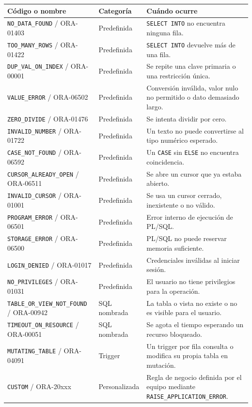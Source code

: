 \documentclass[10pt,letterpaper]{article}
\begin{document}
\begin{longtable}{p{} p{} p{}}
\toprule \textbf{Código o nombre} & \textbf{Categoría} & \textbf{Cuándo ocurre}\\
\midrule
\texttt{NO\_DATA\_FOUND} / ORA-01403 & Predefinida & \texttt{SELECT INTO} no encuentra ninguna fila.\\
\texttt{TOO\_MANY\_ROWS} / ORA-01422 & Predefinida & \texttt{SELECT INTO} devuelve más de una fila.\\
\texttt{DUP\_VAL\_ON\_INDEX} / ORA-00001 & Predefinida & Se repite una clave primaria o una restricción única.\\
\texttt{VALUE\_ERROR} / ORA-06502 & Predefinida & Conversión inválida, valor nulo no permitido o dato demasiado largo.\\
\texttt{ZERO\_DIVIDE} / ORA-01476 & Predefinida & Se intenta dividir por cero.\\
\texttt{INVALID\_NUMBER} / ORA-01722 & Predefinida & Un texto no puede convertirse al tipo numérico esperado.\\
\texttt{CASE\_NOT\_FOUND} / ORA-06592 & Predefinida & Un \texttt{CASE} sin \texttt{ELSE} no encuentra coincidencia.\\
\texttt{CURSOR\_ALREADY\_OPEN} / ORA-06511 & Predefinida & Se abre un cursor que ya estaba abierto.\\
\texttt{INVALID\_CURSOR} / ORA-01001 & Predefinida & Se usa un cursor cerrado, inexistente o no válido.\\
\texttt{PROGRAM\_ERROR} / ORA-06501 & Predefinida & Error interno de ejecución de PL/SQL.\\
\texttt{STORAGE\_ERROR} / ORA-06500 & Predefinida & PL/SQL no puede reservar memoria suficiente.\\
\texttt{LOGIN\_DENIED} / ORA-01017 & Predefinida & Credenciales inválidas al iniciar sesión.\\
\texttt{NO\_PRIVILEGES} / ORA-01031 & Predefinida & El usuario no tiene privilegios para la operación.\\
\texttt{TABLE\_OR\_VIEW\_NOT\_FOUND} / ORA-00942 & SQL nombrada & La tabla o vista no existe o no es visible para el usuario.\\
\texttt{TIMEOUT\_ON\_RESOURCE} / ORA-00051 & SQL nombrada & Se agota el tiempo esperando un recurso bloqueado.\\
\texttt{MUTATING\_TABLE} / ORA-04091 & Trigger & Un trigger por fila consulta o modifica su propia tabla en mutación.\\
\texttt{CUSTOM} / ORA-20xxx & Personalizada & Regla de negocio definida por el equipo mediante \texttt{RAISE\_APPLICATION\_ERROR}.\\
\bottomrule
\end{longtable}
\end{document}
